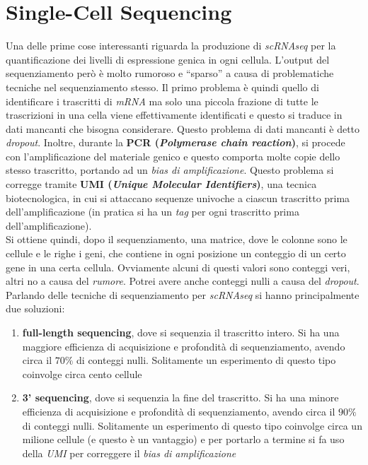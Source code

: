 \documentclass[a4paper,12pt, oneside]{book}
\begin{document}
\section{Single-Cell Sequencing}
Una delle prime cose interessanti riguarda la produzione di \textit{scRNAseq}
per la quantificazione dei livelli di espressione genica in ogni
cellula. L'output del sequenziamento però è molto rumoroso e ``sparso'' a causa
di problematiche tecniche nel sequenziamento stesso. Il primo problema è quindi
quello di identificare i trascritti di \textit{mRNA} ma solo una piccola
frazione di tutte le trascrizioni in una cella viene effettivamente identificati
e questo si traduce in dati mancanti che bisogna considerare. Questo problema di
dati mancanti è detto \textit{dropout}. Inoltre, durante
la \textbf{PCR (\textit{Polymerase chain reaction})}, si procede con
l'amplificazione del materiale genico e questo comporta molte copie dello stesso
trascritto, portando ad un \textit{bias di amplificazione}. Questo problema si
corregge tramite \textbf{UMI (\textit{Unique Molecular Identifiers})}, una
tecnica biotecnologica, in cui si attaccano sequenze univoche a ciascun
trascritto prima dell'amplificazione (in pratica si ha un \textit{tag} per ogni
trascritto prima dell'amplificazione). \\
Si ottiene quindi, dopo il sequenziamento, una matrice, dove le colonne sono le
cellule e le righe i geni, che contiene in ogni posizione un conteggio di un
certo gene in una certa cellula. Ovviamente alcuni di questi valori sono
conteggi veri, altri no a causa del \textit{rumore}. Potrei avere anche conteggi
nulli a causa del \textit{dropout}.\\
Parlando delle tecniche di sequenziamento per \textit{scRNAseq} si hanno
principalmente due soluzioni:
\begin{enumerate}
  \item \textbf{full-length sequencing}, dove si sequenzia il trascritto
  intero. Si ha una maggiore efficienza di acquisizione e profondità di
  sequenziamento, avendo circa il $70\%$ di conteggi nulli. Solitamente un
  esperimento di questo tipo coinvolge circa cento cellule
  \item \textbf{3' sequencing}, dove si sequenzia la fine del trascritto. Si ha
  una minore efficienza di acquisizione e profondità di 
  sequenziamento, avendo circa il $90\%$ di conteggi nulli. Solitamente un
  esperimento di questo tipo coinvolge circa un milione cellule (e questo è un
  vantaggio) e per portarlo a termine si fa uso della \textit{UMI} per
  correggere il \textit{bias di amplificazione} 
\end{enumerate}
\end{document}
